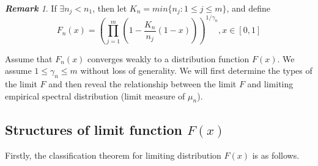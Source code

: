 \documentclass[12pt]{article}
\theoremstyle{plain}
\theoremstyle{definition}
\theoremstyle{remark}
\newtheorem{rem}{\textbf{Remark}}
\begin{document}
\begin{rem}\label{Kn F(x)}
If $\exists n_j<n_1$, then let $K_n=min\{ n_j : 1\leq j\leq m\}$, and define
\begin{equation*}
F_n(x)= \left(\prod_{j=1}^{m} (1-\frac{K_n}{n_j}(1-x))\right) ^{1 / \gamma_{n}},  x \in[0,1]
\end{equation*}
\end{rem}

Assume that $F_n(x)$ converges weakly to a distribution function
$F(x)$. We assume $1\leq\gamma_{n}\leq m$ without loss of
generality.  We will first determine the types of the limit $F$ and
then reveal the relationship between the limit $F$ and limiting
empirical spectral distribution (limit measure of $\mu_n$).




\subsection{Structures of limit function $F(x)$}

Firstly, the classification theorem for limiting distribution $F(x)$
is as follows.
\end{document}
